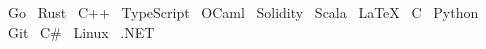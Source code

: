 
\raggedright{
  \textbullet{}~Go
  \textbullet{}~Rust
  \textbullet{}~C++
  \textbullet{}~TypeScript
  \textbullet{}~OCaml
  \textbullet{}~Solidity
  \textbullet{}~Scala
  \textbullet{}~\LaTeX
  \textbullet{}~C
  \textbullet{}~Python
  \textbullet{}~Git
  \textbullet{}~C\#
  \textbullet{}~Linux
  \textbullet{}~.NET
}